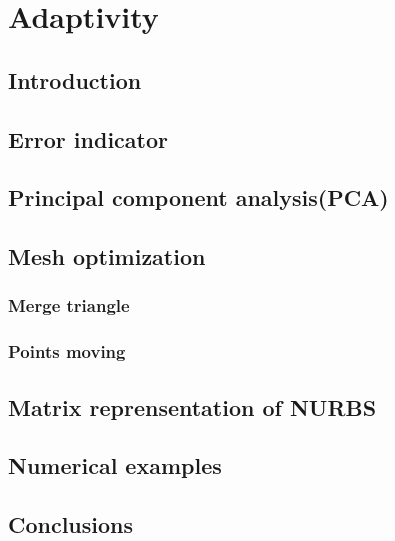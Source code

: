 
\chapter{Adaptivity}

\section{Introduction}

\section{Error indicator}
    

\section{Principal component analysis(PCA)}

\section{Mesh optimization}

    \subsection{Merge triangle}
        \label{adap_merge_triangle}
        
    \subsection{Points moving}

    \pagebreak

\section{Matrix reprensentation of NURBS}
    \label{adap_sec_mrep2d}
    
    \pagebreak

\section{Numerical examples}

\section{Conclusions}

